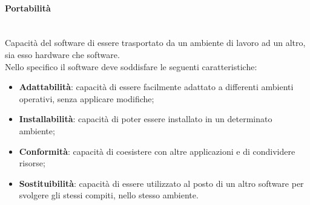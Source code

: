 		\paragraph{Portabilità}\leavevmode \\
		Capacità del software di essere trasportato da un ambiente di lavoro ad un altro, sia esso hardware che software.\\
		Nello specifico il software deve soddisfare le seguenti caratteristiche:
		\begin{itemize}
			\item \textbf{Adattabilità}:
			capacità di essere facilmente adattato a differenti ambienti operativi, senza applicare modifiche;
			\item \textbf{Installabilità}: capacità di poter essere installato in un determinato ambiente;
			\item \textbf{Conformità}: capacità di coesistere con altre applicazioni e di condividere risorse;
			\item \textbf{Sostituibilità}: capacità di essere utilizzato al posto di un altro software per svolgere gli stessi compiti, nello stesso ambiente.
		\end{itemize}